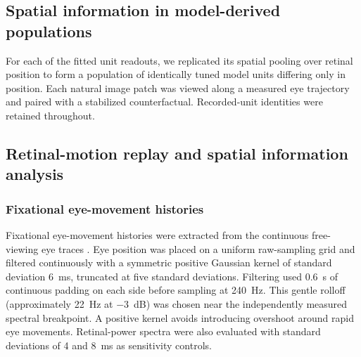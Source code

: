 \documentclass{lite}
\begin{document}
\subsection{Spatial information in model-derived populations}
For each of the \FigFourUnits{} fitted unit readouts, we replicated its spatial pooling over retinal position to form a population of identically tuned model units differing only in position. Each natural image patch was viewed along a measured eye trajectory and paired with a stabilized counterfactual. Recorded-unit identities were retained throughout.

\subsection{Retinal-motion replay and spatial information analysis}

\subsubsection{Fixational eye-movement histories}

Fixational eye-movement histories were extracted from the continuous free-viewing eye traces \cite{yates2023detailed}. Eye position was placed on a uniform raw-sampling grid and filtered continuously with a symmetric positive Gaussian kernel of standard deviation 6~ms, truncated at five standard deviations. Filtering used 0.6~s of continuous padding on each side before sampling at 240~Hz. This gentle rolloff (approximately 22~Hz at $-3$~dB) was chosen near the independently measured spectral breakpoint. A positive kernel avoids introducing overshoot around rapid eye movements. Retinal-power spectra were also evaluated with standard deviations of 4 and 8~ms as sensitivity controls.
\end{document}
